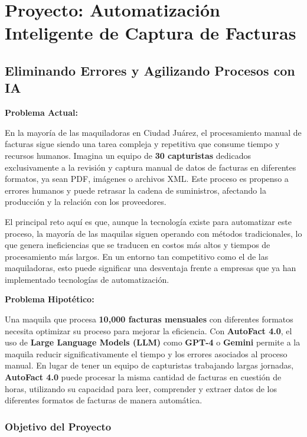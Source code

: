 
\section{Proyecto: Automatización Inteligente de Captura de Facturas}
\label{sec:automatizacion-facturas}

\subsection{Eliminando Errores y Agilizando Procesos con IA}

\textbf{Problema Actual:}

En la mayoría de las maquiladoras en Ciudad Juárez, el procesamiento manual de facturas sigue siendo una tarea compleja y repetitiva que consume tiempo y recursos humanos. Imagina un equipo de \textbf{30 capturistas} dedicados exclusivamente a la revisión y captura manual de datos de facturas en diferentes formatos, ya sean PDF, imágenes o archivos XML. Este proceso es propenso a errores humanos y puede retrasar la cadena de suministros, afectando la producción y la relación con los proveedores.

El principal reto aquí es que, aunque la tecnología existe para automatizar este proceso, la mayoría de las maquilas siguen operando con métodos tradicionales, lo que genera ineficiencias que se traducen en costos más altos y tiempos de procesamiento más largos. En un entorno tan competitivo como el de las maquiladoras, esto puede significar una desventaja frente a empresas que ya han implementado tecnologías de automatización.

\textbf{Problema Hipotético:}

Una maquila que procesa \textbf{10,000 facturas mensuales} con diferentes formatos necesita optimizar su proceso para mejorar la eficiencia. Con \textbf{AutoFact 4.0}, el uso de \textbf{Large Language Models (LLM)} como \textbf{GPT-4} o \textbf{Gemini} permite a la maquila reducir significativamente el tiempo y los errores asociados al proceso manual. En lugar de tener un equipo de capturistas trabajando largas jornadas, \textbf{AutoFact 4.0} puede procesar la misma cantidad de facturas en cuestión de horas, utilizando su capacidad para leer, comprender y extraer datos de los diferentes formatos de facturas de manera automática.

\subsubsection{Objetivo del Proyecto}

